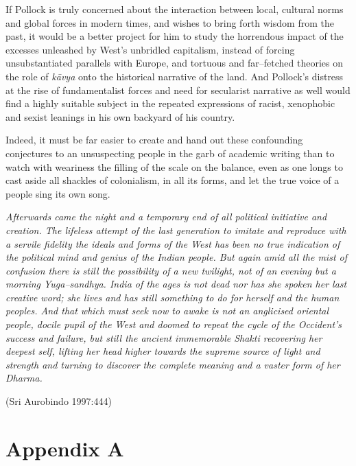 If Pollock is truly concerned about the interaction between local, cultural norms and global forces in modern times, and wishes to bring forth wisdom from the past, it would be a better project for him to study the horrendous impact of the excesses unleashed by West’s unbridled capitalism, instead of forcing unsubstantiated parallels with Europe, and tortuous and far–fetched theories on the role of \textit{kāvya} onto the historical narrative of the land. And Pollock’s distress at the rise of fundamentalist forces and need for secularist narrative as well would find a highly suitable subject in the repeated expressions of racist, xenophobic and sexist leanings in his own backyard of his country.

Indeed, it must be far easier to create and hand out these confounding conjectures to an unsuspecting people in the garb of academic writing than to watch with weariness the filling of the scale on the balance, even as one longs to cast aside all shackles of colonialism, in all its forms, and let the true voice of a people sing its own song.

\begin{myquote}
\textit{Afterwards came the night and a temporary end of all political initiative and creation. The lifeless attempt of the last generation to imitate and reproduce with a servile fidelity the ideals and forms of the West has been no true indication of the political mind and genius of the Indian people. But again amid all the mist of confusion there is still the possibility of a new twilight, not of an evening but a morning Yuga–sandhya. India of the ages is not dead nor has she spoken her last creative word; she lives and has still something to do for herself and the human peoples. And that which must seek now to awake is not an anglicised oriental people, docile pupil of the West and doomed to repeat the cycle of the Occident’s success and failure, but still the ancient immemorable Shakti recovering her deepest self, lifting her head higher towards the supreme source of light and strength and turning to discover the complete meaning and a vaster form of her Dharma.}
\end{myquote}

\hfill (Sri Aurobindo 1997:444)


\section*{Appendix A}

